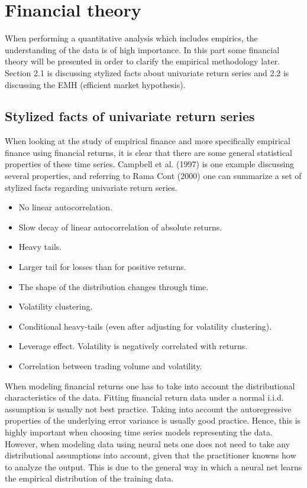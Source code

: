 \documentclass[12pt, letterpaper]{amsart}%
\begin{document}
\section{Financial theory}
When performing a quantitative analysis which includes empirics, the understanding of the data is of high importance. In this part some financial theory will be presented in order to clarify the empirical methodology later. Section 2.1 is discussing stylized facts about univariate return series and 2.2 is discussing the EMH (efficient market hypothesis).

\subsection{Stylized facts of univariate return series}
When looking at the study of empirical finance and more specifically empirical finance using financial returns, it is clear that there are some general statistical properties of these time series. Campbell et al. (1997) is one example discussing several properties, and referring to Rama Cont (2000) one can summarize a set of stylized facts regarding univariate return series.
\\

\begin{itemize}  
\item No linear autocorrelation.
\item Slow decay of linear autocorrelation of absolute returns.
\item Heavy tails.
\item Larger tail for losses than for positive returns.
\item The shape of the distribution changes through time.
\item Volatility clustering.
\item Conditional heavy-tails (even after adjusting for volatility clustering).
\item Leverage effect. Volatility is negatively correlated with returns.
\item Correlation between trading volume and volatility.
\end{itemize}
\vspace{0.5cm}

When modeling financial returns one has to take into account the distributional characteristics of the data. Fitting financial return data under a normal i.i.d. assumption is usually not best practice. Taking into account the autoregressive properties of the underlying error variance is usually good practice. Hence, this is highly important when choosing time series models representing the data. However, when modeling data using neural nets one does not need to take any distributional assumptions into account, given that the practitioner knowns how to analyze the output. This is due to the general way in which a neural net learns the empirical distribution of the training data.
\end{document}
